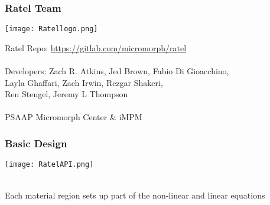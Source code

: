 \documentclass{beamer}
\begin{document}
\begin{frame}
\frametitle{Ratel Team}

\begin{center}
\texttt{[image: Ratellogo.png]}
\end{center}

{\flushleft

Ratel Repo: \href{https://gitlab.com/micromorph/ratel}{https://gitlab.com/micromorph/ratel}\\

~\\
Developers: Zach R. Atkins, Jed Brown, Fabio Di Gioacchino,\\
\hspace{19mm} Layla Ghaffari, Zach Irwin, Rezgar Shakeri,\\
\hspace{19mm} Ren Stengel, Jeremy L Thompson\\

~\\

PSAAP Micromorph Center \& iMPM

}

\end{frame}


\begin{frame}
\begin{center}
\frametitle{Basic Design}

\texttt{[image: RatelAPI.png]}

~\\

Each material region sets up part of the non-linear and linear equations\\

\end{center}
\end{frame}

\end{document}
